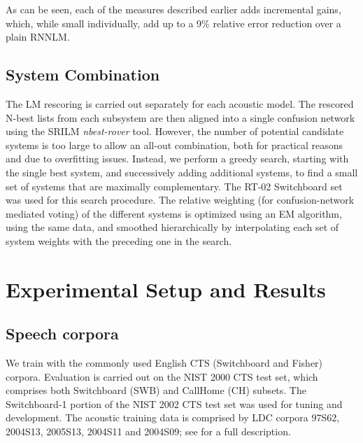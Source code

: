 \documentclass{article}
\begin{document}
As can be seen, each of the measures described earlier adds incremental gains, which,
while small individually, add up to a 9\% relative error reduction over a plain RNNLM.


\subsection{System Combination}

The LM rescoring is carried out separately for each acoustic model.
The rescored N-best lists from each subsystem are then aligned into a single confusion 
network \cite{sri-2000} using the SRILM {\em nbest-rover} tool.
However, the number of potential candidate systems is too large to allow an all-out combination,
both for practical reasons and due to overfitting issues.
Instead, we perform a greedy search, starting with the single best system, and 
successively adding additional systems,
to find a small set of systems that are maximally complementary.
The RT-02 Switchboard set was used for this search procedure.
The relative weighting (for confusion-network mediated voting) of the different systems is 
optimized using an EM algorithm, using the same data, and smoothed hierarchically by 
interpolating each set of system weights with the preceding one in the search.


\section{Experimental Setup and Results}
\label{sec:results}

\subsection{Speech corpora}

We train with the commonly used English CTS (Switchboard and Fisher) corpora.
Evaluation is carried out on the NIST 2000 CTS test set, which comprises both Switchboard (SWB) and CallHome (CH)
subsets.
The Switchboard-1 portion of the NIST 2002 CTS test set was used for tuning and development.
The acoustic training data is comprised by LDC corpora 97S62, 2004S13, 2005S13,
2004S11 and 2004S09; see \cite{chen2006advances} for a full description.
\end{document}

